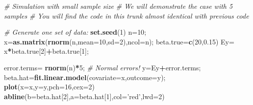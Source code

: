 \documentclass[12pt,]{book}
\newenvironment{Shaded}{\begin{snugshade}}{\end{snugshade}}
\newcommand{\KeywordTok}[1]{\textcolor[rgb]{0.13,0.29,0.53}{\textbf{#1}}}
\newcommand{\DataTypeTok}[1]{\textcolor[rgb]{0.13,0.29,0.53}{#1}}
\newcommand{\DecValTok}[1]{\textcolor[rgb]{0.00,0.00,0.81}{#1}}
\newcommand{\FloatTok}[1]{\textcolor[rgb]{0.00,0.00,0.81}{#1}}
\newcommand{\StringTok}[1]{\textcolor[rgb]{0.31,0.60,0.02}{#1}}
\newcommand{\CommentTok}[1]{\textcolor[rgb]{0.56,0.35,0.01}{\textit{#1}}}
\newcommand{\OperatorTok}[1]{\textcolor[rgb]{0.81,0.36,0.00}{\textbf{#1}}}
\newcommand{\NormalTok}[1]{#1}
\begin{document}
\begin{Shaded}
\begin{Highlighting}[]
\CommentTok{# Simulation with small sample size}
\CommentTok{# We will demonstrate the case with 5 samples}
\CommentTok{# You will find the code in this trunk almost identical with previous code}

\CommentTok{# Generate one set of data:}
\KeywordTok{set.seed}\NormalTok{(}\DecValTok{1}\NormalTok{)}
\NormalTok{n=}\DecValTok{10}\NormalTok{;}
\NormalTok{x=}\KeywordTok{as.matrix}\NormalTok{(}\KeywordTok{rnorm}\NormalTok{(n,}\DataTypeTok{mean=}\DecValTok{10}\NormalTok{,}\DataTypeTok{sd=}\DecValTok{2}\NormalTok{),}\DataTypeTok{ncol=}\NormalTok{n);}
\NormalTok{beta.true=}\KeywordTok{c}\NormalTok{(}\DecValTok{20}\NormalTok{,}\FloatTok{0.15}\NormalTok{)}
\NormalTok{Ey=}\StringTok{ }\NormalTok{x}\OperatorTok{*}\NormalTok{beta.true[}\DecValTok{2}\NormalTok{]}\OperatorTok{+}\NormalTok{beta.true[}\DecValTok{1}\NormalTok{];}

\NormalTok{error.terms=}\StringTok{ }\KeywordTok{rnorm}\NormalTok{(n)}\OperatorTok{*}\DecValTok{5}\NormalTok{; }\CommentTok{# Normal errors!}
\NormalTok{y=Ey}\OperatorTok{+}\NormalTok{error.terms;}
\NormalTok{beta.hat=}\KeywordTok{fit.linear.model}\NormalTok{(}\DataTypeTok{covariate=}\NormalTok{x,}\DataTypeTok{outcome=}\NormalTok{y);}
\KeywordTok{plot}\NormalTok{(}\DataTypeTok{x=}\NormalTok{x,}\DataTypeTok{y=}\NormalTok{y,}\DataTypeTok{pch=}\DecValTok{16}\NormalTok{,}\DataTypeTok{cex=}\DecValTok{2}\NormalTok{)}
\KeywordTok{abline}\NormalTok{(}\DataTypeTok{b=}\NormalTok{beta.hat[}\DecValTok{2}\NormalTok{],}\DataTypeTok{a=}\NormalTok{beta.hat[}\DecValTok{1}\NormalTok{],}\DataTypeTok{col=}\StringTok{'red'}\NormalTok{,}\DataTypeTok{lwd=}\DecValTok{2}\NormalTok{)}
\end{Highlighting}
\end{Shaded}
\end{document}
